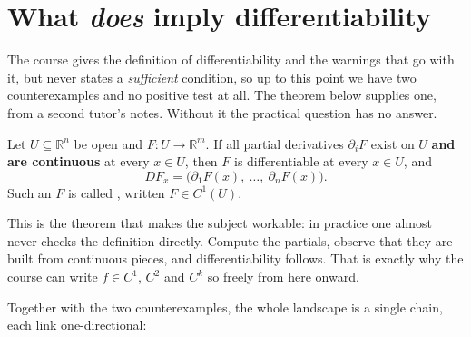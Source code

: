 
\section{What \emph{does} imply differentiability}
\label{sec:sufficient_condition_differentiability}

\begin{ainote}
The course gives the definition of differentiability and the warnings that go with it, but never
states a \emph{sufficient} condition, so up to this point we have two counterexamples and no
positive test at all. The theorem below supplies one, from a second tutor's notes. Without it the
practical question  has no answer.
\end{ainote}

\begin{theorem}
\label{thm:continuous_partials_imply_differentiable}
Let $U \subseteq \mathbb{R}^n$ be open and $F : U \to \mathbb{R}^m$. If all partial derivatives
$\partial_iF$ exist on $U$ \textbf{and are continuous} at every $x \in U$, then $F$ is
differentiable at every $x \in U$, and
\[DF_x = \big(\partial_1F(x),\ \dots,\ \partial_nF(x)\big).\]
Such an $F$ is called , written $F \in C^1(U)$.
\end{theorem}

This is the theorem that makes the subject workable: in practice one almost never checks the
definition directly. Compute the partials, observe that they are built from continuous pieces,
and differentiability follows. That is exactly why the course can write $f \in C^1$, $C^2$ and
$C^k$ so freely from here onward.

Together with the two counterexamples, the whole landscape is a single chain, each link
one-directional:

